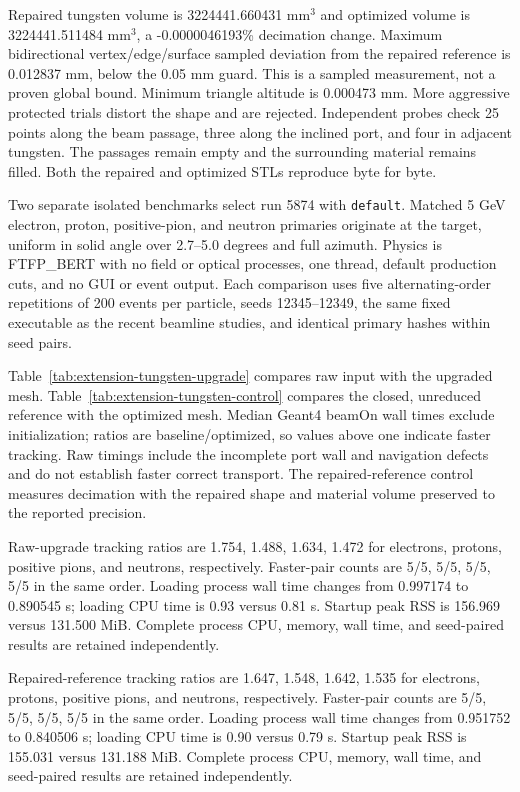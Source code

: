 Repaired tungsten volume is 3224441.660431 mm$^3$ and optimized volume is 3224441.511484 mm$^3$, a
-0.0000046193\% decimation change. Maximum bidirectional vertex/edge/surface sampled deviation from the
repaired reference is 0.012837 mm, below the 0.05 mm guard. This is a sampled measurement, not a proven global
bound. Minimum triangle altitude is 0.000473 mm. More aggressive protected trials distort the shape and are
rejected. Independent probes check 25 points along the beam passage, three along the inclined port, and four
in adjacent tungsten. The passages remain empty and the surrounding material remains filled. Both the repaired
and optimized STLs reproduce byte for byte.

Two separate isolated benchmarks select run 5874 with \texttt{default}. Matched 5 GeV electron, proton,
positive-pion, and neutron primaries originate at the target, uniform in solid angle over 2.7--5.0 degrees and
full azimuth. Physics is FTFP\_BERT with no field or optical processes, one thread, default production cuts,
and no GUI or event output. Each comparison uses five alternating-order repetitions of 200 events per
particle, seeds 12345--12349, the same fixed executable as the recent beamline studies, and identical primary
hashes within seed pairs.

Table~\ref{tab:extension-tungsten-upgrade} compares raw input with the upgraded mesh.
Table~\ref{tab:extension-tungsten-control} compares the closed, unreduced reference with the optimized mesh.
Median Geant4 beamOn wall times exclude initialization; ratios are baseline/optimized, so values above one
indicate faster tracking. Raw timings include the incomplete port wall and navigation defects and do not
establish faster correct transport. The repaired-reference control measures decimation with the repaired shape
and material volume preserved to the reported precision.

Raw-upgrade tracking ratios are 1.754, 1.488, 1.634, 1.472 for electrons, protons, positive pions, and
neutrons, respectively. Faster-pair counts are 5/5, 5/5, 5/5, 5/5 in the same order. Loading process wall time
changes from 0.997174 to 0.890545 s; loading CPU time is 0.93 versus 0.81 s. Startup peak RSS is 156.969
versus 131.500 MiB. Complete process CPU, memory, wall time, and seed-paired results are retained
independently.

Repaired-reference tracking ratios are 1.647, 1.548, 1.642, 1.535 for electrons, protons, positive pions, and
neutrons, respectively. Faster-pair counts are 5/5, 5/5, 5/5, 5/5 in the same order. Loading process wall time
changes from 0.951752 to 0.840506 s; loading CPU time is 0.90 versus 0.79 s. Startup peak RSS is 155.031
versus 131.188 MiB. Complete process CPU, memory, wall time, and seed-paired results are retained
independently.

